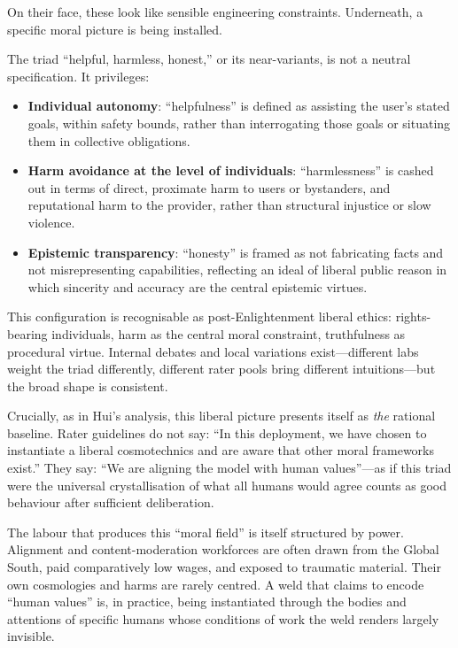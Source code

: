 \documentclass[12pt,a4paper]{article}
\begin{document}
On their face, these look like sensible engineering constraints. Underneath, a specific moral picture is being installed.

The triad ``helpful, harmless, honest,'' or its near-variants, is not a neutral specification. It privileges:

\begin{itemize}
  \item \textbf{Individual autonomy}: ``helpfulness'' is defined as assisting the user's stated goals, within safety bounds, rather than interrogating those goals or situating them in collective obligations.
  \item \textbf{Harm avoidance at the level of individuals}: ``harmlessness'' is cashed out in terms of direct, proximate harm to users or bystanders, and reputational harm to the provider, rather than structural injustice or slow violence.
  \item \textbf{Epistemic transparency}: ``honesty'' is framed as not fabricating facts and not misrepresenting capabilities, reflecting an ideal of liberal public reason in which sincerity and accuracy are the central epistemic virtues.
\end{itemize}

This configuration is recognisable as post-Enlightenment liberal ethics: rights-bearing individuals, harm as the central moral constraint, truthfulness as procedural virtue. Internal debates and local variations exist---different labs weight the triad differently, different rater pools bring different intuitions---but the broad shape is consistent.

Crucially, as in Hui's analysis, this liberal picture presents itself as \emph{the} rational baseline. Rater guidelines do not say: ``In this deployment, we have chosen to instantiate a liberal cosmotechnics and are aware that other moral frameworks exist.'' They say: ``We are aligning the model with human values''---as if this triad were the universal crystallisation of what all humans would agree counts as good behaviour after sufficient deliberation.

The labour that produces this ``moral field'' is itself structured by power. Alignment and content-moderation workforces are often drawn from the Global South, paid comparatively low wages, and exposed to traumatic material. Their own cosmologies and harms are rarely centred. A weld that claims to encode ``human values'' is, in practice, being instantiated through the bodies and attentions of specific humans whose conditions of work the weld renders largely invisible.
\end{document}
